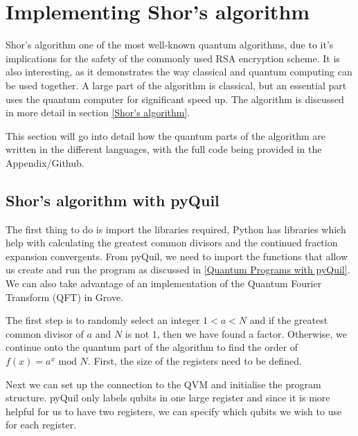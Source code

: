 \section{Implementing Shor's algorithm}

Shor's algorithm one of the most well-known quantum algorithms, due to it's implications for the safety of the commonly used RSA encryption scheme. It is also interesting, as it demonstrates the way classical and quantum computing can be used together. A large part of the algorithm is classical, but an essential part uses the quantum computer for significant speed up. The algorithm is discussed in more detail in section \ref{Shor's algorithm}.

This section will go into detail how the quantum parts of the algorithm are written in the different languages, with the full code being provided in the Appendix/Github.

\subsection{Shor's algorithm with pyQuil}

The first thing to do is import the libraries required, Python has libraries which help with calculating the greatest common divisors and the continued fraction expansion convergents. From pyQuil, we need to import the functions that allow us create and run the program as discussed in \autoref{Quantum Programs with pyQuil}. We can also take advantage of an implementation of the Quantum Fourier Transform (QFT) in Grove. 



The first step is to randomly select an integer $1 < a < N$ and if the greatest common divisor of $a$ and $N$ is not $1$, then we have found a factor. Otherwise, we continue onto the quantum part of the algorithm to find the order of $f(x) = a^x \text{ mod } N$. First, the size of the registers need to be defined.



Next we can set up the connection to the QVM and initialise the program structure. pyQuil only labels qubits in one large register and since it is more helpful for us to have two registers, we can specify which qubits we wish to use for each register.


